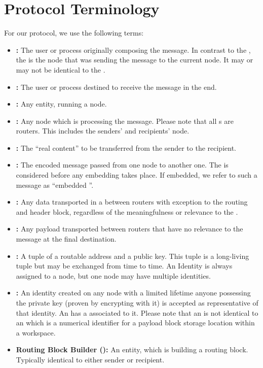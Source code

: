 \section{Protocol Terminology}
For our protocol, we use the following terms:
\begin{itemize}
	\item \textbf{:} The user or process originally composing the message. In contrast to the , the  is the node that was sending the message to the current node. It may or may not be identical to the .
	\item \textbf{:} The user or process destined to receive the message in the end.
	\item \textbf{:} Any entity, running a \MessageVortex{} node.
	\item \textbf{:} Any node which is processing the message. Please note that all \VortexNode{}s are routers. This includes the senders' and recipients' node.
	\item \textbf{:} The ``real content'' to be transferred from the sender to the recipient.    
	\item \textbf{:} The encoded message passed from one node to another one. The \VortexMessage{} is considered before any embedding takes place. If embedded, we refer to such a message as ``embedded \VortexMessage''.
	\item \textbf{:} Any data transported in a \VortexMessage{} between routers with exception to the routing and header block, regardless of the meaningfulness or relevance to the \VortexMessage.
	\item \textbf{:} Any payload transported between routers that have no relevance to the message at the final destination.
	\item \textbf{:} A tuple of a routable address and a public key. This tuple is a long-living tuple but may be exchanged from time to time. An Identity is always assigned to a node, but one node may have multiple identities. 
	\item \textbf{:} An identity created on any node with a limited lifetime anyone possessing the private key (proven by encrypting with it) is accepted as representative of that identity. An  has a  associated to it. Please note that an  is not identical to an  which is a numerical identifier for a payload block storage location within a workspace.
	\item \textbf{Routing Block Builder ():} An entity, which is building a routing block. Typically identical to either sender or recipient.
\end{itemize}

